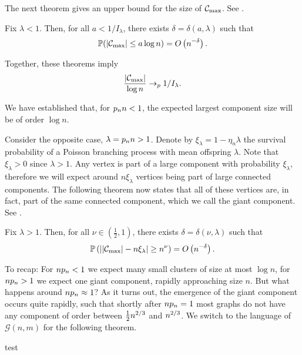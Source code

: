 The next theorem gives an upper bound for the size of $\mathcal{C}_{\max}$.
See \cite[Theorem 4.5, p.125]{vanderHofstad.2016}.
\begin{theorem}
	Fix $\lambda < 1$. 
	Then, for all $a < 1/I_{\lambda}$, 
	there exists $\delta = \delta(a, \lambda)$ such that
	\begin{equation}
	\mathbb{P}( |\mathcal{C}_{\max}| \leq a \log n ) = O\left(n^{-\delta}\right).
	\end{equation}
\end{theorem}

Together, these theorems imply
\begin{equation}
	\frac{|\mathcal{C}_{\max}|}{\log n} \rightarrow_p 1/I_{\lambda}.
\end{equation}

We have established that, for $p_n n < 1$, the expected largest component size will be of order $\log n$.

Consider the opposite case, $\lambda = p_n n > 1$. 
Denote by $\xi_\lambda = 1 - \eta_n\lambda$ the survival probability of a Poisson branching process with mean offspring $\lambda$.
Note that $\xi_\lambda > 0$ since $\lambda > 1$.
Any vertex is part of a large component with probability $\xi_\lambda$, 
therefore we will expect around $n \xi_\lambda$ vertices being part of large connected components.
The following theorem now states that all of these vertices are, in fact, part of the same connected component, which we call the giant component.
See \cite[Theorem 4.8, p.131]{vanderHofstad.2016}.
\begin{theorem}
	Fix $\lambda>1$.
	Then, for all $\nu \in (\frac{1}{2}, 1)$, there exists $\delta = \delta(\nu, \lambda)$ such that
	\begin{equation}
		\mathbb{P}\left( \left| |\mathcal{C}_{\max}| - n \xi_\lambda \right| \geq n^{\nu}\right) = O\left(n^{-\delta}\right).
	\end{equation}
\end{theorem}


To recap: For $n p_n < 1$ we expect many small clusters of size at most $\log n$,
for $n p_n > 1$ we expect one giant component, rapidly approaching size $n$.
But what happens around $n p_n \approx 1$?
As it turns out, the emergence of the giant component occurs quite rapidly,
such that shortly after $n p_n = 1$ most graphs do not have any component of order between $\frac{1}{2}n^{2 / 3}$ and $n^{2 / 3}$.
We switch to the language of $\mathscr{G}(n,m)$ for the following theorem.
\begin{theorem}
test
\end{theorem}

